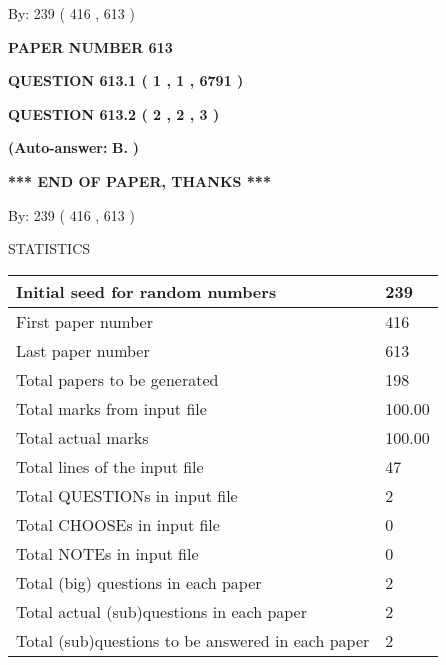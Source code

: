 \documentclass[12pt]{article}
\begin{document}
   
\hspace{1.0in} By: 
 239 ( 416 ,  613 )
   
   
   
   
\newpage 
\setcounter{page}{ 
   613001 } 
   
   
 {\textbf{ \Large{ PAPER NUMBER  613  }}}
   
   
   
   
  
  
{\textbf{\large{QUESTION
613.1 
 ( 1 , 1 , 6791 )
}}}
  
  
{\textbf{\large{QUESTION
613.2 
 ( 2 , 2 , 3 )
}}}
 
 
{\textbf{(Auto-answer:}}
{\textbf{\large{
B.}}}
{\textbf{)}}
 
 
   
   
   
   
\vspace{1.0in} 
{\textbf{\large{ *** END OF PAPER, THANKS *** }}} 
   
   
\hspace{1.0in} By: 
 239 ( 416 ,  613 )
   
   
   
\vspace{0.2in}
\vspace{0.2in}
   
   
 \newpage
\setcounter{page}{1} 
   
   
 {\LARGE{STATISTICS}}
   
\vspace{0.2in}
   
 \begin{tabular}{|l|l|}
 \hline
 Initial seed for random numbers & 239  \\
\hline
 First paper number & 416  \\
\hline
 Last  paper number & 613  \\
\hline
 Total papers to be generated & 198  \\
\hline
Total marks from input file & 100.00 \\
\hline
Total actual marks & 100.00 \\
\hline
 Total lines of the input file & 47  \\
 \hline
 Total QUESTIONs in input file & 2  \\
\hline
 Total CHOOSEs in input file & 0  \\
\hline
 Total NOTEs in input file & 0  \\
\hline
 Total (big) questions in each paper & 2  \\
\hline
 Total actual (sub)questions in each paper & 2  \\
\hline
 Total (sub)questions to be answered in each paper & 2  \\
\hline
 \end{tabular}
   
\end{document}
